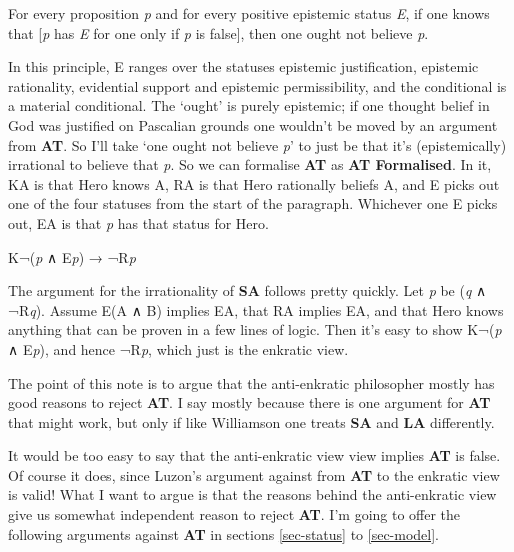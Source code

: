 \documentclass[
  11pt,
  letterpaper,
  DIV=11,
  numbers=noendperiod,
  twoside]{scrartcl}
\providecommand{\tightlist}{%
  \setlength{\itemsep}{0pt}\setlength{\parskip}{0pt}}
\begin{document}
\begin{description}
\tightlist
\item[Avoid Treachery (AT)]
For every proposition \emph{p} and for every positive epistemic status
\emph{E}, if one knows that {[}\emph{p} has \emph{E} for one only if
\emph{p} is false{]}, then one ought not believe \emph{p}.
\end{description}

In this principle, E ranges over the statuses epistemic justification,
epistemic rationality, evidential support and epistemic permissibility,
and the conditional is a material conditional. The `ought' is purely
epistemic; if one thought belief in God was justified on Pascalian
grounds one wouldn't be moved by an argument from \textbf{AT}. So I'll
take `one ought not believe \emph{p}' to just be that it's
(epistemically) irrational to believe that \emph{p}. So we can formalise
\textbf{AT} as \textbf{AT Formalised}. In it, KA is that Hero knows A,
RA is that Hero rationally beliefs A, and E picks out one of the four
statuses from the start of the paragraph. Whichever one E picks out, EA
is that \emph{p} has that status for Hero.

\begin{description}
\tightlist
\item[AT Formalised]
K¬(\emph{p} ∧ E\emph{p}) → ¬R\emph{p}
\end{description}

The argument for the irrationality of \textbf{SA} follows pretty
quickly. Let \emph{p} be (\emph{q} ∧ ¬R\emph{q}). Assume E(A ∧ B)
implies EA, that RA implies EA, and that Hero knows anything that can be
proven in a few lines of logic. Then it's easy to show K¬(\emph{p} ∧
E\emph{p}), and hence ¬R\emph{p}, which just is the enkratic view.

The point of this note is to argue that the anti-enkratic philosopher
mostly has good reasons to reject \textbf{AT}. I say mostly because
there is one argument for \textbf{AT} that might work, but only if like
Williamson one treats \textbf{SA} and \textbf{LA} differently.

It would be too easy to say that the anti-enkratic view view implies
\textbf{AT} is false. Of course it does, since Luzon's argument against
from \textbf{AT} to the enkratic view is valid! What I want to argue is
that the reasons behind the anti-enkratic view give us somewhat
independent reason to reject \textbf{AT}. I'm going to offer the
following arguments against \textbf{AT} in sections \ref{sec-status} to
\ref{sec-model}.
\end{document}
